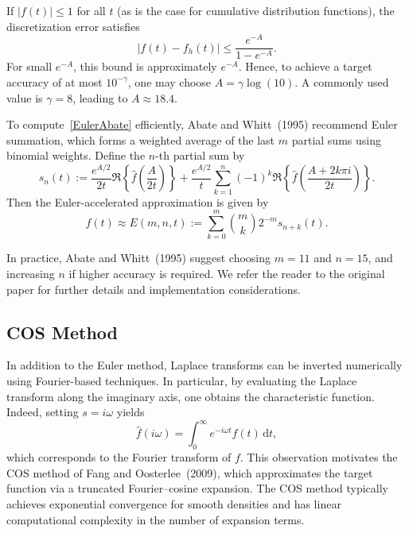\documentclass[11pt]{article}
\begin{document}
If $|f(t)|\leq 1$ for all $t$ (as is the case for cumulative distribution functions), the discretization error satisfies
\begin{equation}
    \bigl|f(t)-f_h(t)\bigr|
    \leq
    \frac{e^{-A}}{1-e^{-A}}.
\end{equation}
For small $e^{-A}$, this bound is approximately $e^{-A}$. Hence, to achieve a target accuracy of at most $10^{-\gamma}$, one may choose $A=\gamma\log(10)$. A commonly used value is $\gamma=8$, leading to $A\approx 18.4$.

To compute~\eqref{EulerAbate} efficiently, Abate and Whitt~(1995) recommend Euler summation, which forms a weighted average of the last $m$ partial sums using binomial weights. Define the $n$-th partial sum by
\begin{equation}
    s_n(t)
    :=
    \frac{e^{A/2}}{2t}
    \Re\!\left\{
    \hat{f}\!\left(\frac{A}{2t}\right)
    \right\}
    +
    \frac{e^{A/2}}{t}
    \sum_{k=1}^{n}
    (-1)^k
    \Re\!\left\{
    \hat{f}\!\left(\frac{A+2k\pi i}{2t}\right)
    \right\}.
\end{equation}
Then the Euler-accelerated approximation is given by
\begin{equation}
    f(t)
    \approx
    E(m,n,t)
    :=
    \sum_{k=0}^{m}
    \binom{m}{k}2^{-m}
    s_{n+k}(t).
\end{equation}

In practice, Abate and Whitt~(1995) suggest choosing $m=11$ and $n=15$, and increasing $n$ if higher accuracy is required. We refer the reader to the original paper for further details and implementation considerations.

\subsection{COS Method}\label{sec: cosmethod}

In addition to the Euler method, Laplace transforms can be inverted numerically using Fourier-based techniques.
In particular, by evaluating the Laplace transform along the imaginary axis, one obtains the characteristic function.
Indeed, setting $s=i\omega$ yields
\begin{equation}
    \hat{f}(i\omega)
    =
    \int_{0}^{\infty} e^{-i\omega t} f(t)\,\mathrm{d}t,
\end{equation}
which corresponds to the Fourier transform of $f$.
This observation motivates the COS method of Fang and Oosterlee~(2009), which approximates the target function via a truncated Fourier--cosine expansion.
The COS method typically achieves exponential convergence for smooth densities and has linear computational complexity in the number of expansion terms.
\end{document}
